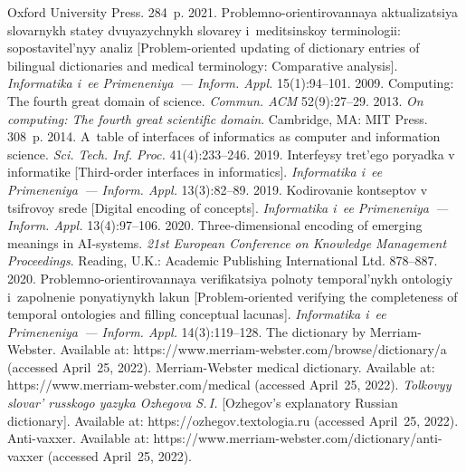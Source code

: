 \begin{multicols}{2}
{{\begin{thebibliography}{99}
Oxford University Press. 284~p.
 2021. Problemno-orientirovannaya ak\-tua\-li\-za\-tsiya slovarnykh statey dvuyazychnykh 
slovarey i~me\-di\-tsin\-skoy terminologii: sopostavitel'nyy analiz [Problem-oriented updating of dictionary 
entries of bilingual \mbox{dictionaries} and medical terminology: Comparative analysis]. \textit{Informatika 
i~ee Primeneniya~--- Inform. Appl.} 15(1):94--101.
 2009. Computing: The fourth great domain of science. 
\textit{Commun. ACM} 52(9):27--29.
 2013. \textit{On computing: The fourth great scientific domain}. Cambridge, 
MA: MIT Press. 308~p.
 2014. A~table of interfaces of informatics as computer and information science. 
\textit{Sci. Tech. Inf. Proc.} 41(4):233--246.
 2019. Interfeysy tret'ego poryadka v informatike [Third-order interfaces in 
informatics]. \textit{Informatika i~ee Primeneniya~--- Inform. Appl.} 13(3):82--89.
 2019. Kodirovanie kontseptov v tsifrovoy srede [Digital encoding of concepts]. 
\textit{Informatika i~ee Primeneniya~--- Inform. Appl.} 13(4):97--106.
 2020. Three-dimensional encoding of emerging meanings in AI-systems. \textit{21st 
European Conference on Knowledge Management Proceedings}. Reading, U.K.: Academic Publishing 
International Ltd. 878--887.
 2020. Problemno-orientirovannaya ve\-ri\-fi\-ka\-tsiya polnoty temporal'nykh ontologiy 
i~zapolnenie po\-nya\-tiy\-nykh lakun [Problem-oriented verifying the completeness of temporal ontologies 
and filling conceptual lacunas]. \textit{Informatika i~ee Primeneniya~--- Inform. Appl.}  
14(3):119--128.
The dictionary by Merriam-Webster. Available at: {\sf  
https://\linebreak www.merriam-webster.com/browse/dictionary/a} (accessed April~25, 2022).
Merriam-Webster medical dictionary. Available at: {\sf https://www.merriam-webster.com/medical} 
(accessed April~25, 2022). 
\textit{Tolkovyy slovar' russkogo yazyka Ozhegova S.\,I.} [Ozhegov's explanatory Russian 
dictionary]. Available at: {\sf https://ozhegov.textologia.ru} (accessed April~25, 2022).
Anti-vaxxer. Available at: {\sf https://www.merriam-webster.\linebreak com/dictionary/anti-vaxxer} (accessed 
April~25, 2022).

\end{thebibliography}}}
\end{multicols}

